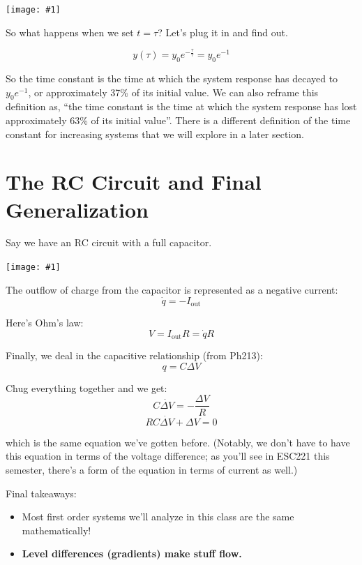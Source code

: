 \documentclass{report}
\newcommand{\bicture}[1]{
\begin{center}
    {\texttt{[image: \#1]}}
\end{center}}
\begin{document}
\begin{onehalfspacing}
\begin{flushleft}
\bicture{2_exp}

So what happens when we set \(t=\tau\)? Let's plug it in and find out.

\[y(\tau) = y_0 e^{-\frac{\tau}{\tau}} = y_0 e^{-1}\]

So the time constant is the time at which the system response has decayed to \(y_0 e^{-1}\), or approximately 37\% of its initial value. We can also reframe this definition as, ``the time constant is the time at which the system response has lost approximately 63\% of its initial value''. There is a different definition of the time constant for increasing systems that we will explore in a later section.

\section{The RC Circuit and Final Generalization}

Say we have an RC circuit with a full capacitor. 

\bicture{2_rc}

The outflow of charge from the capacitor is represented as a negative current:
\vspace{-0.1in}
\[\dot{q} = -I_\text{out}\]

Here's Ohm's law:
\vspace{-0.1in}
\[V = I_\text{out} R = \dot{q} R\]

Finally, we deal in the capacitive relationship (from Ph213):
\vspace{-0.1in}
\[q = C\Delta V\]

Chug everything together and we get:
\vspace{-0.1in}
\[C\dot{\Delta V} = -\frac{\Delta V}{R}\]
\[\boxed{RC \dot{\Delta V} + \Delta V = 0}\]

which is the same equation we've gotten before. (Notably, we don't have to have this equation in terms of the voltage difference; as you'll see in ESC221 this semester, there's a form of the equation in terms of current as well.)

\medskip

Final takeaways:
\begin{itemize}[noitemsep,topsep=0.5pt]
    \item Most first order systems we'll analyze in this class are the same mathematically!
    \item \textbf{Level differences (gradients) make stuff flow.}
\end{itemize}


\end{flushleft}
\end{onehalfspacing}
\end{document}
